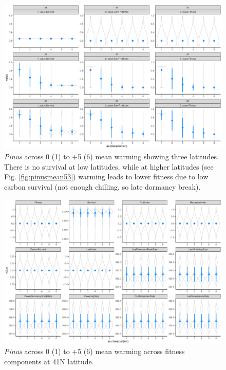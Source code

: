 \documentclass[11pt,letter]{article}
\begin{document}
\begin{figure} 
 \begin{center}
\noindent \includegraphics[width=1\textwidth]{..//analyses/graphs/phenofit/sims/metrics3/meansim_3metricsPS.pdf}
  \caption{\emph{Pinus} across 0 (1) to $+$5 (6) mean warming showing three latitudes. There is no survival at low latitudes, while at higher latitudes (see Fig. \ref{fig:pinusmean53}) warming leads to lower fitness due to low carbon survival (not enough chilling, so late dormancy break).}
  \label{fig:pinusmean3}
  \end{center}
\end{figure}

\begin{figure} 
 \begin{center}
\noindent \includegraphics[width=1\textwidth]{..//analyses/graphs/phenofit/sims/meansim41_allmetricsPS.pdf}
  \caption{\emph{Pinus} across 0 (1) to $+$5 (6) mean warming across fitness components at 41\degree N latitude.}
  \label{fig:pinusmean41}
  \end{center}
\end{figure}
\end{document}

